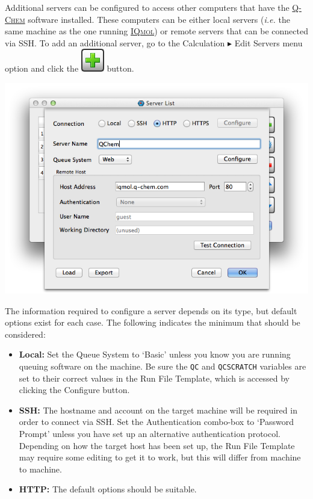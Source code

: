 \documentclass[a4paper,12pt]{article}
\newcommand{\qchem}{\href{http://q-chem.com}{{\scshape Q-Chem}}}
\newcommand{\iqmol}{\href{http://iqmol.org}{{\scshape IQmol}}}
\begin{document}
Additional servers can be configured to access other computers that have the
\qchem{} software installed.  These computers can be either local servers
(\emph{i.e.}  the same machine as the one running \iqmol{}) or remote servers
that can be connected  via SSH.  To add an additional server, go to the
Calculation $\blacktriangleright$ Edit Servers menu option and click the
\includegraphics[scale=0.40]{figures/PlusButton.png} button.  
\begin{center}
\includegraphics[scale=0.5]{figures/ServerDialog.png}
\end{center}

The information required to configure a server depends on its type, but default
options exist for each case.  The following indicates the minimum that should
be considered:

\begin{itemize}
\item {\bf Local:} Set the Queue System to `Basic'
      unless you know you are running queuing software on the machine.
      Be sure the {\tt QC} and {\tt QCSCRATCH} variables are set to their correct
	  values in the Run File Template, which is accessed by clicking the Configure
      button.
\item {\bf SSH:} The hostname and account on the target machine will 
      be required in order to connect via SSH.  Set the Authentication combo-box to
      `Password Prompt' unless you have set up an alternative authentication protocol.
	  Depending on how the target host has been set up, the Run File Template
	  may require some editing to get it to work, but this will differ from
      machine to machine.
\item {\bf HTTP:} The default options should be suitable.
\end{itemize}
\end{document}
